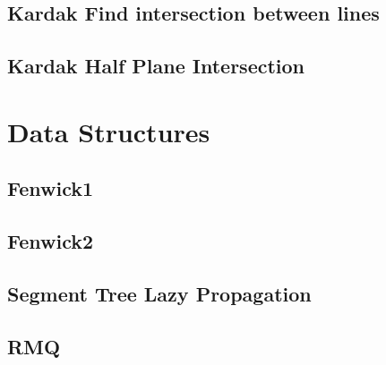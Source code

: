 \documentclass[a4paper,landscape]{article}
\begin{document}
\begin{multicols}{2}
\subsection{Kardak Find intersection between lines}
	
\subsection{Kardak Half Plane Intersection}
	


\section{Data Structures}
\subsection{Fenwick1}
	
\subsection{Fenwick2}
	
\subsection{Segment Tree Lazy Propagation}
	
\subsection{RMQ}
	

\end{multicols}
\end{document}
